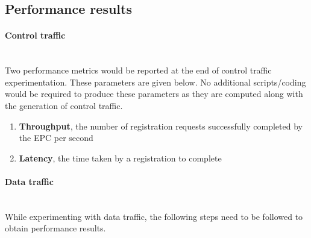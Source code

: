 \pdfminorversion=4\documentclass[hidelinks]{report}
\begin{document}
\subsection*{Performance results}

\paragraph*{Control traffic}

~\\ Two performance metrics would be reported at the end of control traffic experimentation. These parameters are given below. No additional scripts/coding would be required to produce these parameters as they are computed along with the generation of control traffic. 

\begin{enumerate}

\item \textbf{Throughput}, the number of registration requests successfully completed by the EPC per second

\item \textbf{Latency}, the time taken by a registration to complete

\end{enumerate}

\paragraph*{Data traffic}

~\\ While experimenting with data traffic, the following steps need to be followed to obtain performance results.
\end{document}

